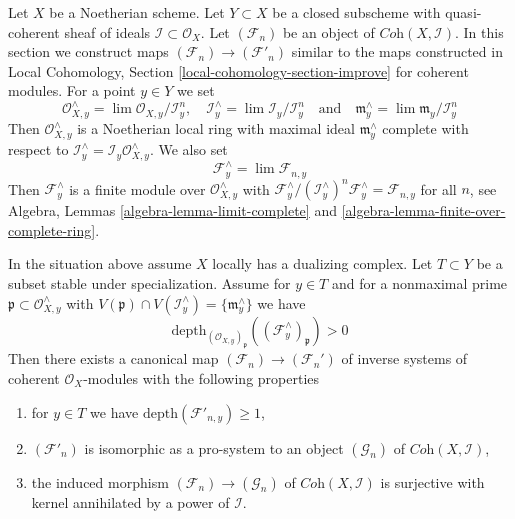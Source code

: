 \noindent
Let $X$ be a Noetherian scheme. Let $Y \subset X$ be a closed subscheme
with quasi-coherent sheaf of ideals $\mathcal{I} \subset \mathcal{O}_X$.
Let $(\mathcal{F}_n)$ be an object of $\textit{Coh}(X, \mathcal{I})$.
In this section we construct maps
$(\mathcal{F}_n) \to (\mathcal{F}'_n)$
similar to the maps constructed in
Local Cohomology, Section \ref{local-cohomology-section-improve}
for coherent modules. For a point $y \in Y$ we set
$$
\mathcal{O}_{X, y}^\wedge = \lim \mathcal{O}_{X, y}/\mathcal{I}^n_y, \quad
\mathcal{I}_y^\wedge = \lim \mathcal{I}_y/\mathcal{I}^n_y
\quad\text{and}\quad
\mathfrak m_y^\wedge = \lim \mathfrak m_y/\mathcal{I}_y^n
$$
Then $\mathcal{O}_{X, y}^\wedge$ is a Noetherian local ring
with maximal ideal $\mathfrak m_y^\wedge$ complete with respect to
$\mathcal{I}_y^\wedge = \mathcal{I}_y\mathcal{O}_{X, y}^\wedge$.
We also set
$$
\mathcal{F}_y^\wedge = \lim \mathcal{F}_{n, y}
$$
Then $\mathcal{F}_y^\wedge$ is a finite module over
$\mathcal{O}_{X, y}^\wedge$ with
$\mathcal{F}_y^\wedge/(\mathcal{I}_y^\wedge)^n\mathcal{F}_y^\wedge =
\mathcal{F}_{n, y}$ for all $n$, see Algebra, Lemmas
\ref{algebra-lemma-limit-complete} and
\ref{algebra-lemma-finite-over-complete-ring}.

\begin{lemma}
\label{lemma-divide-torsion-formal-coherent-module}
In the situation above assume $X$ locally has a dualizing complex.
Let $T \subset Y$ be a subset stable under specialization.
Assume for $y \in T$ and for a nonmaximal prime
$\mathfrak p \subset \mathcal{O}_{X, y}^\wedge$ with
$V(\mathfrak p) \cap V(\mathcal{I}^\wedge_y) = \{\mathfrak m_y^\wedge\}$
we have
$$
\text{depth}_{(\mathcal{O}_{X, y})_\mathfrak p}
((\mathcal{F}^\wedge_y)_\mathfrak p) > 0
$$
Then there exists a canonical map
$(\mathcal{F}_n) \to (\mathcal{F}_n')$
of inverse systems of coherent $\mathcal{O}_X$-modules
with the following properties
\begin{enumerate}
\item for $y \in T$ we have $\text{depth}(\mathcal{F}'_{n, y}) \geq 1$,
\item $(\mathcal{F}'_n)$ is isomorphic as a pro-system to an object
$(\mathcal{G}_n)$ of $\textit{Coh}(X, \mathcal{I})$,
\item the induced morphism
$(\mathcal{F}_n) \to (\mathcal{G}_n)$ of
$\textit{Coh}(X, \mathcal{I})$ is surjective with kernel
annihilated by a power of $\mathcal{I}$.
\end{enumerate}
\end{lemma}

